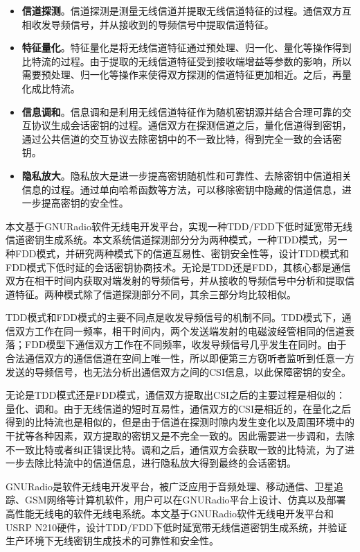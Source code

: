 \documentclass[master]{seuthesis} %
\begin{document}
\begin{Main}
\begin{itemize}
    \item \textbf{信道探测}。信道探测是测量无线信道并提取无线信道特征的过程。通信双方互相收发导频信号，并从接收到的导频信号中提取信道特征。
    \item \textbf{特征量化}。特征量化是将无线信道特征通过预处理、归一化、量化等操作得到比特流的过程。由于提取的无线信道特征受到接收端增益等参数的影响，所以需要预处理、归一化等操作来使得双方探测的信道特征更加相近。之后，再量化成比特流。
    \item \textbf{信息调和}。信息调和是利用无线信道特征作为随机密钥源并结合合理可靠的交互协议生成会话密钥的过程。通信双方在探测信道之后，量化信道得到密钥，通过公共信道的交互协议去除密钥中的不一致比特，得到完全一致的会话密钥。
    \item \textbf{隐私放大}。隐私放大是进一步提高密钥随机性和可靠性、去除密钥中信道相关信息的过程。通过单向哈希函数等方法，可以移除密钥中隐藏的信道信息，进一步提高密钥的安全性。
\end{itemize}

本文基于GNURadio软件无线电开发平台，实现一种TDD/FDD下低时延宽带无线信道密钥生成系统。本文系统信道探测部分分为两种模式，一种TDD模式，另一种FDD模式，并研究两种模式下的信道互易性、密钥安全性等，设计TDD模式和FDD模式下低时延的会话密钥协商技术。无论是TDD还是FDD，其核心都是通信双方在相干时间内获取对端发射的导频信号，并从接收的导频信号中分析和提取信道特征。两种模式除了信道探测部分不同，其余三部分均比较相似。

TDD模式和FDD模式的主要不同点是收发导频信号的机制不同。TDD模式下，通信双方工作在同一频率，相干时间内，两个发送端发射的电磁波经管相同的信道衰落；FDD模型下通信双方工作在不同频率，收发导频信号几乎发生在同时。由于合法通信双方的通信信道在空间上唯一性，所以即便第三方窃听者监听到任意一方发送的导频信号，也无法分析出通信双方之间的CSI信息，以此保障密钥的安全。

无论是TDD模式还是FDD模式，通信双方提取出CSI之后的主要过程是相似的：量化、调和。由于无线信道的短时互易性，通信双方的CSI是相近的，在量化之后得到的比特流也是相似的，但是由于信道在探测时隙内发生变化以及周围环境中的干扰等各种因素，双方提取的密钥又是不完全一致的。因此需要进一步调和，去除不一致比特或者纠正错误比特。调和之后，通信双方会获取一致的比特流，为了进一步去除比特流中的信道信息，进行隐私放大得到最终的会话密钥。

GNURadio是软件无线电开发平台，被广泛应用于音频处理、移动通信、卫星追踪、GSM网络等计算机软件\cite{Blossom2004GNU}，用户可以在GNURadio平台上设计、仿真以及部署高性能无线电的软件无线电系统。本文基于GNURadio软件无线电开发平台和USRP N210硬件，设计TDD/FDD下低时延宽带无线信道密钥生成系统，并验证生产环境下无线密钥生成技术的可靠性和安全性。


\end{Main}
\end{document}
